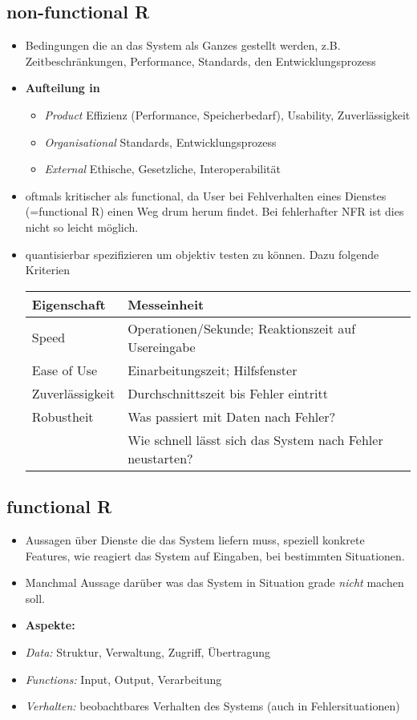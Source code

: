 \subsection{non-functional R}
\begin{itemize}
	\item Bedingungen die an das System als Ganzes gestellt werden, z.B. Zeitbeschränkungen, Performance, Standards, den Entwicklungsprozess
	\item \textbf{Aufteilung in}
	\begin{itemize}
		\item \textit{Product} Effizienz (Performance, Speicherbedarf), Usability, Zuverlässigkeit
		\item \textit{Organisational} Standards, Entwicklungsprozess
		\item \textit{External} Ethische, Gesetzliche, Interoperabilität
	\end{itemize}
	\item oftmals kritischer als functional, da User bei Fehlverhalten eines Dienstes (=functional R) einen Weg drum herum findet. Bei fehlerhafter NFR ist dies nicht so leicht möglich.
	\item quantisierbar spezifizieren um objektiv testen zu können. Dazu folgende Kriterien
	\begin{table}[!h]
		\begin{tabular}{|l|l|}
			\hline
			\textbf{Eigenschaft}	& \textbf{Messeinheit}\\
			\hline
			Speed		& Operationen/Sekunde; Reaktionszeit auf Usereingabe\\
			Ease of Use	& Einarbeitungszeit; Hilfsfenster\\
			Zuverlässigkeit & Durchschnittszeit bis Fehler eintritt\\
			Robustheit & Was passiert mit Daten nach Fehler?\\
			& Wie schnell lässt sich das System nach Fehler neustarten?\\
			\hline
		\end{tabular}
	\end{table}
	
\end{itemize}

\subsection{functional R}
\begin{itemize}
	\item Aussagen über Dienste die das System liefern muss, speziell konkrete Features, wie reagiert das System auf Eingaben, bei bestimmten Situationen.
	\item Manchmal Aussage darüber was das System in Situation grade \textit{nicht} machen soll.
	\item \textbf{Aspekte:}
	\item \textit{Data:} Struktur, Verwaltung, Zugriff, Übertragung
	\item \textit{Functions:} Input, Output, Verarbeitung
	\item \textit{Verhalten:} beobachtbares Verhalten des Systems (auch in Fehlersituationen)
\end{itemize}

